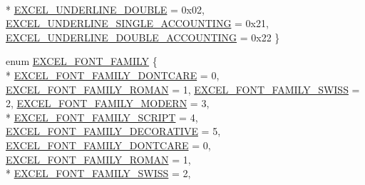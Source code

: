 \begin{DoxyCompactItemize}
\\*
\hyperlink{namespace_excel_format_a24c0e7797c103f21f016a661ee583267aa35a908773eb55b7ccb2a49ee5ffa16e}{E\+X\+C\+E\+L\+\_\+\+U\+N\+D\+E\+R\+L\+I\+N\+E\+\_\+\+D\+O\+U\+B\+L\+E} = 0x02, 
\hyperlink{namespace_excel_format_a24c0e7797c103f21f016a661ee583267afff01cd731b0f2bf2c912fd0a81b94cf}{E\+X\+C\+E\+L\+\_\+\+U\+N\+D\+E\+R\+L\+I\+N\+E\+\_\+\+S\+I\+N\+G\+L\+E\+\_\+\+A\+C\+C\+O\+U\+N\+T\+I\+N\+G} = 0x21, 
\hyperlink{namespace_excel_format_a24c0e7797c103f21f016a661ee583267aa8fd5f992f62a78173f580ee6903acc5}{E\+X\+C\+E\+L\+\_\+\+U\+N\+D\+E\+R\+L\+I\+N\+E\+\_\+\+D\+O\+U\+B\+L\+E\+\_\+\+A\+C\+C\+O\+U\+N\+T\+I\+N\+G} = 0x22
 \}
\item 
enum \hyperlink{namespace_excel_format_a4f47c1508e4d09e1e52265feed4bedff}{E\+X\+C\+E\+L\+\_\+\+F\+O\+N\+T\+\_\+\+F\+A\+M\+I\+L\+Y} \{ \\*
\hyperlink{namespace_excel_format_a4f47c1508e4d09e1e52265feed4bedffaa3b2a84415ff3addee1bb0379d1825c2}{E\+X\+C\+E\+L\+\_\+\+F\+O\+N\+T\+\_\+\+F\+A\+M\+I\+L\+Y\+\_\+\+D\+O\+N\+T\+C\+A\+R\+E} = 0, 
\hyperlink{namespace_excel_format_a4f47c1508e4d09e1e52265feed4bedffaa314068e9f59c88bc6a3097231e53425}{E\+X\+C\+E\+L\+\_\+\+F\+O\+N\+T\+\_\+\+F\+A\+M\+I\+L\+Y\+\_\+\+R\+O\+M\+A\+N} = 1, 
\hyperlink{namespace_excel_format_a4f47c1508e4d09e1e52265feed4bedffa1260c7ea55749f1f8f64472318944bab}{E\+X\+C\+E\+L\+\_\+\+F\+O\+N\+T\+\_\+\+F\+A\+M\+I\+L\+Y\+\_\+\+S\+W\+I\+S\+S} = 2, 
\hyperlink{namespace_excel_format_a4f47c1508e4d09e1e52265feed4bedffa6138e3673e0ada2f804cd4ebe800372f}{E\+X\+C\+E\+L\+\_\+\+F\+O\+N\+T\+\_\+\+F\+A\+M\+I\+L\+Y\+\_\+\+M\+O\+D\+E\+R\+N} = 3, 
\\*
\hyperlink{namespace_excel_format_a4f47c1508e4d09e1e52265feed4bedffa28980aa8d83866c2f8df062131aee4f6}{E\+X\+C\+E\+L\+\_\+\+F\+O\+N\+T\+\_\+\+F\+A\+M\+I\+L\+Y\+\_\+\+S\+C\+R\+I\+P\+T} = 4, 
\hyperlink{namespace_excel_format_a4f47c1508e4d09e1e52265feed4bedffa9e9228b64e3bf56fd30b5e6e056b7745}{E\+X\+C\+E\+L\+\_\+\+F\+O\+N\+T\+\_\+\+F\+A\+M\+I\+L\+Y\+\_\+\+D\+E\+C\+O\+R\+A\+T\+I\+V\+E} = 5, 
\hyperlink{namespace_excel_format_a4f47c1508e4d09e1e52265feed4bedffaa3b2a84415ff3addee1bb0379d1825c2}{E\+X\+C\+E\+L\+\_\+\+F\+O\+N\+T\+\_\+\+F\+A\+M\+I\+L\+Y\+\_\+\+D\+O\+N\+T\+C\+A\+R\+E} = 0, 
\hyperlink{namespace_excel_format_a4f47c1508e4d09e1e52265feed4bedffaa314068e9f59c88bc6a3097231e53425}{E\+X\+C\+E\+L\+\_\+\+F\+O\+N\+T\+\_\+\+F\+A\+M\+I\+L\+Y\+\_\+\+R\+O\+M\+A\+N} = 1, 
\\*
\hyperlink{namespace_excel_format_a4f47c1508e4d09e1e52265feed4bedffa1260c7ea55749f1f8f64472318944bab}{E\+X\+C\+E\+L\+\_\+\+F\+O\+N\+T\+\_\+\+F\+A\+M\+I\+L\+Y\+\_\+\+S\+W\+I\+S\+S} = 2, 

\end{DoxyCompactItemize}
